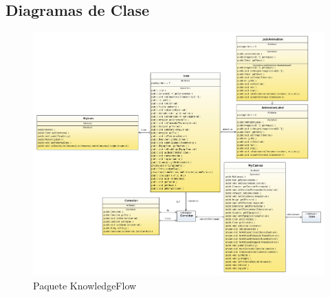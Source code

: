 % 
% 
\subsection{Diagramas de Clase}

\begin{figure}[ht]
\centering
\includegraphics[width=1.1\textwidth]{imgsClases/KnowledgeFlow.png}
\caption{Paquete KnowledgeFlow}
\end{figure}
\newpage
